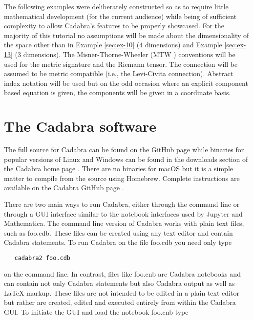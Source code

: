 \documentclass[a4paper,12pt]{article}
\numberwithin{equation}{section}%
\begin{document}
The following examples were deliberately constructed so as to require little mathematical
development (for the current audience) while being of sufficient complexity to allow
Cadabra's features to be properly showcased. For the majority of this tutorial no
assumptions will be made about the dimensionality of the space other than in Example
\ref{sec:ex-10} (4 dimensions) and Example \ref{sec:ex-13} (3 dimensions). The
Misner-Thorne-Wheeler (MTW \cite{mtw:1973-01}) conventions will be used for the metric
signature and the Riemann tensor. The connection will be assumed to be metric compatible
(i.e., the Levi-Civita connection). Abstract index notation will be used but on the odd
occasion where an explicit component based equation is given, the components will be given
in a coordinate basis.

\section*{The Cadabra software}

The full source for Cadabra can be found on the GitHub page \cite{peeters:2017-02} while
binaries for popular versions of Linux and Windows can be found in the downloads section of
the Cadabra home page \cite{peeters:2017-01}. There are no binaries for macOS but it is a
simple matter to compile from the source using Homebrew. Complete instructions are available
on the Cadabra GitHub page \cite{peeters:2017-02}.

There are two main ways to run Cadabra, either through the command line or through a GUI
interface similar to the notebook interfaces used by Jupyter and Mathematica. The command
line version of Cadabra works with plain text files, such as {\tts foo.cdb}. These files can
be created using any text editor and contain Cadabra statements. To run Cadabra on the file
{\tts foo.cdb} you need only type

\bgroup
\lstset{numbers=none}
\begin{lstlisting}
   cadabra2 foo.cdb
\end{lstlisting}
\egroup

on the command line. In contrast, files like {\tts foo.cnb} are Cadabra notebooks and can
contain not only Cadabra statements but also Cadabra output as well as LaTeX markup. These
files are not intended to be edited in a plain text editor but rather are created, edited
and executed entirely from within the Cadabra GUI. To initiate the GUI and load the notebook
{\tts foo.cnb} type
\end{document}

